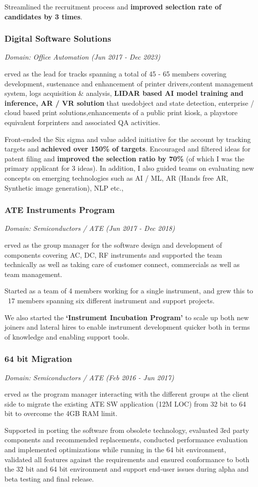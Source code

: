\documentclass[a4paper,11pt]{article}
\newcommand\cvprojectentry[5]{
  \subsubsection*{#1}
  
  \vspace{-7pt}
  
  \it{Domain: #2}\normalfont{} \quad (#3 - #4)
  
}
\begin{document}
Streamlined the recruitment process and \textbf{improved selection rate of
candidates by 3 times}.

\cvprojectentry{Digital Software Solutions}{Office Automation}{Jun 2017}{Dec 2023}

Served as the lead for tracks spanning a total of 45 - 65 members
covering development, sustenance and enhancement of printer
drivers,content management system, logs acquisition \& analysis,
\textbf{LIDAR based AI model training and inference, AR / VR solution}
that usedobject and state detection, enterprise / cloud based print
solutions,enhancements of a public print kiosk, a playstore equivalent
forprinters and associated QA activities.

Front-ended the Six sigma and value added initiative for the account
by tracking targets and \textbf{achieved over 150\% of
  targets}. Encouraged and filtered ideas for patent filing and
\textbf{improved the selection ratio by 70\%} (of which I was the
primary applicant for 3 ideas). In addition, I also guided teams on
evaluating new concepts on emerging technologies such as AI / ML, AR
(Hands free AR, Synthetic image generation), NLP etc.,

\cvprojectentry{ATE Instruments Program}{Semiconductors / ATE}{Jun 2017}{Dec 2018}

Served as the group manager for the software design and development of
components covering AC, DC, RF instruments and supported the team
technically as well as taking care of customer connect, commercials as
well as team management.
  
Started as a team of 4 members working for a single instrument, and
grew this to ~17 members spanning six different instrument and support
projects.

We also started the \textbf{`Instrument Incubation Program'} to scale
up both new joiners and lateral hires to enable instrument development
quicker both in terms of knowledge and enabling support tools.


\cvprojectentry{64 bit Migration}{Semiconductors / ATE}{Feb 2016}{Jun 2017}

Served as the program manager interacting with the different groups at
the client side to migrate the existing ATE SW application (12M LOC)
from 32 bit to 64 bit to overcome the 4GB RAM limit.

Supported in porting the software from obsolete technology, evaluated
3rd party components and recommended replacements, conducted
performance evaluation and implemented optimizations while running in
the 64 bit environment, validated all features against the
requirements and ensured conformance to both the 32 bit and 64 bit
environment and support end-user issues during alpha and beta testing
and final release.
 
\end{document}
